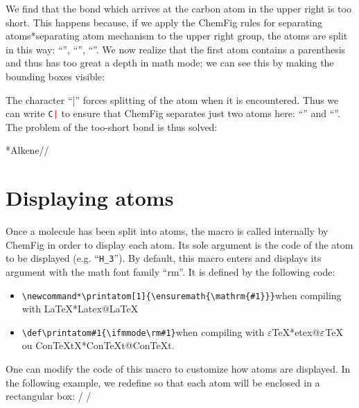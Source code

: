 \documentclass[10pt]{article}
\makeatletter
\newcommand\idx{\@ifstar{\let\print@or@not\@gobble\idx@}{\let\print@or@not\@firstofone\idx@}}
\newcommand\idx@[1]{%
	\ifcat\expandafter\noexpand\@car#1\@nil\relax%
		\expandafter\ifx\@car#1\@nil\protect
			\index{#1}%
			\print@or@not{#1}%
		\else
			\saveexpandmode\expandarg
			\StrSubstitute{\string#1}{\string @}{\@empty\protect\symbol{'100}}[\temp@]%
			\StrGobbleLeft\temp@1[\temp@]%
			\restoreexpandmode
			\expandafter\index\expandafter{\temp@ @\protect\texttt{\protect\textbackslash\temp@}}%
			\print@or@not{\texttt{\string#1}}%
		\fi
	\else
		\index{#1}%
		\print@or@not{#1}%
	\fi
}
\newcommand\make@car@active[1]{%
	\catcode`#1\active
	\begingroup
		\lccode`\~`#1\relax
		\lowercase{\endgroup\def~}%
}
\newif\if@exstar
\newcommand\exemple{%
	\begingroup
	\parskip\z@
	\@makeother\;\@makeother\!\@makeother\?\@makeother\:%
	\@ifstar{\@exstartrue\exemple@}{\@exstarfalse\exemple@}}
\newcommand\exemple@[2][65]{%
	\medbreak\noindent
	\begingroup
		\let\do\@makeother\dospecials
		\make@car@active\ { {}}%
		\make@car@active\^^M{\par\leavevmode}%
		\make@car@active\,{\leavevmode\kern\z@\string,}%
		\make@car@active\-{\leavevmode\kern\z@\string-}%
		\make@car@active\>{\leavevmode\kern\z@\string>}%
		\make@car@active\<{\leavevmode\kern\z@\string<}%
		\exemple@@{#1}{#2}%
}
\newcommand\exemple@@[3]{%
	\def\@tempa##1#3{\exemple@@@{#1}{#2}{##1}}%
	\@tempa
}
\newcommand\exemple@@@[3]{%
	\xdef\the@code{#3}%
	\endgroup
	\if@exstar
		\begingroup
			\fboxrule0.4pt
			\let\breakboxparindent\z@
			\def\bkvz@bottom{\hrule\@height\fboxrule}%
			\let\bkvz@before@breakbox\relax
			\def\bkvz@set@linewidth{\advance\linewidth\dimexpr-2\fboxrule-2\fboxsep}%
			\def\bkvz@left{\vrule\@width\fboxrule\hskip\fboxsep}%
			\def\bkvz@right{\hskip\fboxsep\vrule\@width\fboxrule}%
			\def\bkvz@top{\hbox to \hsize{%
				\vrule\@width\fboxrule\@height\fboxrule
				\leaders\bkvz@bottom\hfill
				\ECFAugie
				\fboxsep\z@
				\colorbox{black}{\kern0.25em\color{white}\footnotesize\lower0.5ex\hbox{\strut#2}\kern0.25em}%
				\leaders\bkvz@bottom\hfill
				\vrule\@width\fboxrule\@height\fboxrule}}%
			\breakbox
				\kern.5ex\relax
				\ttfamily\footnotesize\the@code\par
				\normalfont
				\kern3pt
				\hrule height0.1pt width\linewidth depth0.1pt
				\vskip5pt
				\rightskip0pt plus 1fill
				\everypar{{\color{lightgray}\rlap{\vrule height0.1pt width\linewidth depth0.1pt}}\hskip0pt plus 1fill}%
				\newlinechar`\^^M\everyeof{\noexpand}\scantokens{#3}\par
			\endbreakbox
		\endgroup
	\else
		\vskip0.5ex
		\boxput*(0,1)
			{\fboxsep\z@
			\hbox{\ECFAugie\colorbox{black}{\leavevmode\kern0.25em{\color{white}\footnotesize\strut#2}\kern0.25em}}%
			}%
			{\fboxsep5pt
			\fbox{%
				$\vcenter{\hsize\dimexpr0.#1\linewidth-\fboxsep-\fboxrule\relax
					\kern5pt\parskip0pt \ttfamily\footnotesize\the@code}%
				\vcenter{\kern5pt\hsize\dimexpr\linewidth-0.#1\linewidth-\fboxsep-\fboxrule\relax
					\everypar{{\color{lightgray}\rlap{\vrule height0.1pt width\dimexpr\linewidth-0.#1\linewidth-\fboxsep-\fboxrule depth0.1pt}}}%
					\footnotesize\newlinechar`\^^M\everyeof{\noexpand}\scantokens{#3}}$%
				}%
			}%
	\fi
	\medbreak
	\endgroup
}
\let\do\@makeother\dospecials
\newcommand\CF{{\ECFAugie ChemFig}\xspace}
\makeatother
\begin{document}
We find that the bond which arrives at the carbon atom in the upper right is too short. This happens because, if we apply the \CF rules for separating atoms\idx*{separating atom mechanism} to the upper right group, the atoms are split in this way: ``\texttt{}'', ``\texttt{}'', ``\texttt{}''. We now realize that the first atom contains a parenthesis and thus has too great a depth in math mode; we can see this by making the bounding boxes visible:
\begin{center}
\fboxsep=0pt
\renewcommand*\printatom[1]{\fbox{\ensuremath{\mathrm{#1}}}}%
%
\end{center}
The character ``|'' forces splitting of the atom when it is encountered. Thus we can write \texttt{C\textcolor{red}{|}} to ensure that \CF separates just two atoms here: ``\texttt{}'' and ``\texttt{}''. The problem of the too-short bond is thus solved:

\exemple*{Alkene}//

\section{Displaying atoms}\label{perso.affichage}
Once a molecule has been split into atoms, the macro \idx{\printatom} is called internally by \CF in order to display each atom. Its sole argument is the code of the atom to be displayed (e.g. ``\verb-H_3-''). By default, this macro enters \idx{math mode} and displays its argument with the math font family ``rm''. It is defined by the following code:
\begin{itemize}
	\item \verb|\newcommand*\printatom[1]{\ensuremath{\mathrm{#1}}}|\qquad when compiling with \LaTeX{}\idx*{Latex@\protect\LaTeX}
	\item \verb|\def\printatom#1{\ifmmode\rm#1\else$\rm#1$\fi}|\qquad when compiling with $\varepsilon$\TeX{}\idx*{etex@$\protect\varepsilon$\protect\TeX} ou Con\TeX tX\idx*{ConTeXt@Con\protect\TeX{}t}.
\end{itemize}

One can modify the code of this macro to customize how atoms are displayed. In the following example, we redefine \idx{\printatom} so that each atom will be enclosed in a rectangular box:
\exemple{Redefinition of \string\printatom}/\fboxsep=1pt
\renewcommand*\printatom[1]{\fbox{\ensuremath{\mathrm{#1}}}}
/
\end{document}
